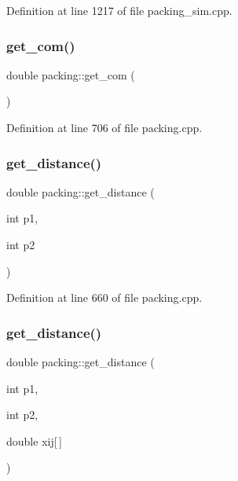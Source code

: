 Definition at line 1217 of file packing\+\_\+sim.\+cpp.

\mbox{\label{classpacking_a654616abad6b4e39903bf1c2f4953c8a}} 
\subsubsection{\texorpdfstring{get\+\_\+com()}{get\_com()}}
{\footnotesize\ttfamily double packing\+::get\+\_\+com (\begin{DoxyParamCaption}{ }\end{DoxyParamCaption})}



Definition at line 706 of file packing.\+cpp.

\mbox{\label{classpacking_acf25ed42e0fdfc8334d9c6468e5c34e1}} 
\subsubsection{\texorpdfstring{get\+\_\+distance()}{get\_distance()}\hspace{0.1cm}{\footnotesize\ttfamily [1/2]}}
{\footnotesize\ttfamily double packing\+::get\+\_\+distance (\begin{DoxyParamCaption}\item[{int}]{p1,  }\item[{int}]{p2 }\end{DoxyParamCaption})}



Definition at line 660 of file packing.\+cpp.

\mbox{\label{classpacking_a79d854d4f45683e8a11652ce90676a90}} 
\subsubsection{\texorpdfstring{get\+\_\+distance()}{get\_distance()}\hspace{0.1cm}{\footnotesize\ttfamily [2/2]}}
{\footnotesize\ttfamily double packing\+::get\+\_\+distance (\begin{DoxyParamCaption}\item[{int}]{p1,  }\item[{int}]{p2,  }\item[{double}]{xij\mbox{[}$\,$\mbox{]} }\end{DoxyParamCaption})}



